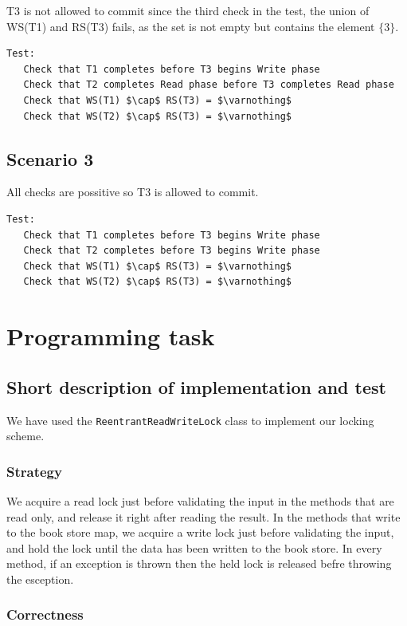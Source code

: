 \documentclass{article}
\theoremstyle{plain}
\theoremstyle{nonumberplain}
\begin{document}
T3 is not allowed to commit since the third check in the test, the union of WS(T1) and RS(T3) fails, as the set is not empty but contains the element $\{3\}$.
\begin{lstlisting}[mathescape]
Test:
   Check that T1 completes before T3 begins Write phase
   Check that T2 completes Read phase before T3 completes Read phase
   Check that WS(T1) $\cap$ RS(T3) = $\varnothing$
   Check that WS(T2) $\cap$ RS(T3) = $\varnothing$
\end{lstlisting}

\subsection{Scenario 3}

All checks are possitive so T3 is allowed to commit. 

\begin{lstlisting}[mathescape]
Test:
   Check that T1 completes before T3 begins Write phase
   Check that T2 completes before T3 begins Write phase
   Check that WS(T1) $\cap$ RS(T3) = $\varnothing$
   Check that WS(T2) $\cap$ RS(T3) = $\varnothing$
\end{lstlisting}

\section{Programming task}

\subsection{Short description of implementation and test}
We have used the \verb|ReentrantReadWriteLock| class to implement our locking scheme.

\subsubsection{Strategy}

We acquire a read lock just before validating the input in the methods that are read only, and release it right after reading the result. In the methods that write to the book store map, we acquire a write lock just before validating the input, and hold the lock until the data has been written to the book store. In every method, if an exception is thrown then the held lock is released befre throwing the esception.

\subsubsection{Correctness}
\end{document}
